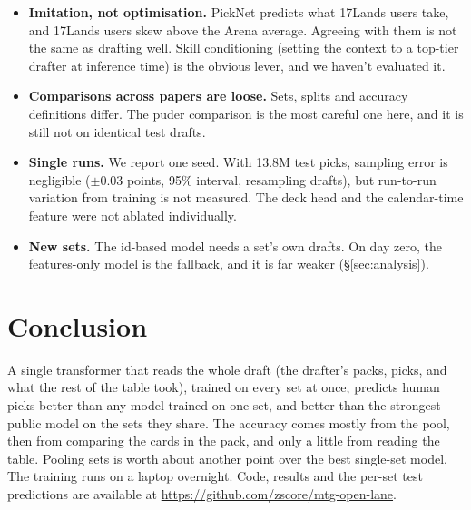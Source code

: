 \documentclass[10pt,letterpaper]{article}
\begin{document}
\begin{itemize}
\item \textbf{Imitation, not optimisation.} PickNet predicts what 17Lands users take, and 17Lands users skew
above the Arena average. Agreeing with them is not the same as drafting well. Skill conditioning
(setting the context to a top-tier drafter at inference time) is the obvious lever, and we haven't evaluated it.
\item \textbf{Comparisons across papers are loose.} Sets, splits and accuracy definitions differ. The
puder comparison is the most careful one here, and it is still not on identical test drafts.
\item \textbf{Single runs.} We report one seed. With 13.8M test picks, sampling error is negligible
($\pm$0.03 points, 95\% interval, resampling drafts), but run-to-run variation from training is not measured. The deck head and the
calendar-time feature were not ablated individually.
\item \textbf{New sets.} The id-based model needs a set's own drafts. On day zero, the features-only model is the
fallback, and it is far weaker (\S\ref{sec:analysis}).
\end{itemize}

\section{Conclusion}

A single transformer that reads the whole draft (the drafter's packs, picks, and what the rest of the table
took), trained on every set at once, predicts human picks better than any model trained on one set, and better
than the strongest public model on the sets they share. The accuracy comes mostly from the pool, then from
comparing the cards in the pack, and only a little from reading the table. Pooling sets is worth about
another point over the best single-set model. The training runs on a laptop overnight. Code, results and the
per-set test predictions are available at \url{https://github.com/zscore/mtg-open-lane}.
\end{document}
